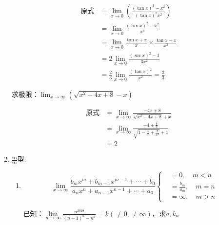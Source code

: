 \begin{enumerate}
            \begin{solution}
                \begin{align*}
                    \text{原式}
                    &=\lim_{x \to 0}(\frac{(\tan x)^2-x^2}{(\tan x)^2 x^2})\\
                    &=\lim_{x \to 0}\frac{(\tan x)^2 -x^2}{x^4}\\
                    &=\lim_{x \to 0}\frac{\tan x +x}{x} \times \frac{\tan x -x}{x^3}\\
                    &=2\lim_{x \to 0}\frac{(\sec x)^2 -1}{3x^2}\\
                    &=\frac{2}{3}\lim_{x \to 0}\frac{(\tan x)^2}{x^2}=\frac{2}{3}
                \end{align*}
            \end{solution}

            \begin{example}
                求极限：$\lim_{x \to \infty}(\sqrt{x^2-4x+8}-x)$
            \end{example}

            \begin{solution}
                \begin{align*}
                    \text{原式}
                    &=\lim_{x \to \infty}\frac{-4x+8}{\sqrt{x^2-4x+8}+x}\\
                    &=\lim_{x \to \infty}\frac{-4+\frac{8}{x}}{\sqrt{1-\frac{4}{x}+\frac{8}{x^2}}+1}\\
                    &=2
                \end{align*}
            \end{solution}

            \item $ \displaystyle\frac{\infty}{\infty} $型:
            \begin{enumerate}
                \item                     
                \[ \lim_{x \to \infty} \frac{b_m x^m+b_{m-1}x^{m-1}+\cdots+b_0}{a_n x^n+a_{n-1}x^{n-1}+\cdots+a_0}
                \left\{
                    \begin{array}{rl}
                        &= 0, \quad m<n\\
                        &= \frac{b_m}{a_m},\quad m=n\\
                        &= \infty,\quad m>n
                    \end{array} \right. \]
           

        \begin{example}
            已知：$\lim\limits_{n \to \infty}\displaystyle\frac{n^{2019}}{(n+1)^a-n^a}=k(\neq 0,\neq \infty)$，求$a,k$。
        \end{example}
        

\end{enumerate}
\end{enumerate}
